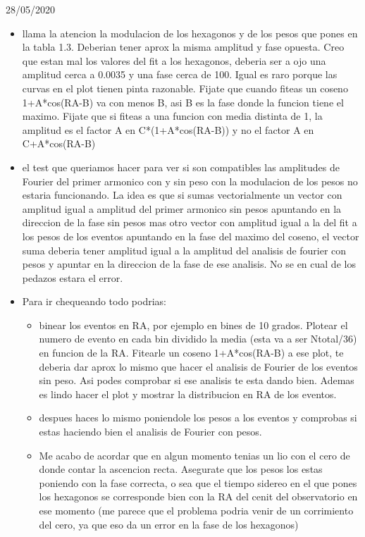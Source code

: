 28/05/2020

\begin{itemize}
	\item llama la atencion la modulacion de los hexagonos y de los pesos que pones en la tabla 1.3. Deberian tener aprox la misma amplitud y fase opuesta. Creo que estan mal los valores del fit a los hexagonos, deberia ser a ojo una amplitud cerca a 0.0035 y una fase cerca de 100. Igual es raro porque las curvas en el plot tienen pinta razonable.
Fijate que cuando fiteas un coseno 1+A*cos(RA-B) va con menos B, asi B es la fase donde la funcion tiene el maximo. Fijate que si fiteas a una funcion con media distinta de 1, la amplitud es el factor A en C*(1+A*cos(RA-B)) y  no el factor  A en C+A*cos(RA-B)
\item  el test que queriamos hacer para ver si son compatibles las amplitudes de Fourier del primer armonico con y sin peso con la modulacion de los pesos no estaria funcionando. La idea es que si sumas vectorialmente un vector con amplitud igual a amplitud del primer armonico sin pesos apuntando en la direccion de la fase sin pesos mas otro vector con amplitud igual a la del fit a los pesos de los eventos apuntando en la fase del maximo del coseno, el vector suma deberia tener amplitud igual a la amplitud del analisis de fourier con pesos y apuntar en la direccion de la fase de ese analisis. No se en cual de los pedazos estara el error.
\item Para ir chequeando todo podrias:
\begin{itemize}
\item  binear los eventos en RA, por ejemplo en bines de 10 grados. Plotear el numero de evento en cada bin dividido la media (esta va a ser Ntotal/36) en funcion de la RA. Fitearle un coseno 1+A*cos(RA-B) a ese plot, te deberia dar aprox lo mismo que hacer el analisis de Fourier de los eventos sin peso. Asi podes comprobar si ese analisis te esta dando bien. Ademas es lindo hacer el plot y mostrar la distribucion en RA de los eventos.
\item  despues haces lo mismo poniendole los pesos a los eventos y comprobas si estas haciendo bien el analisis de Fourier con pesos.
\item  Me acabo de acordar que en algun momento tenias un lio con el  cero de donde contar la ascencion recta. Asegurate que los pesos los estas poniendo con la fase correcta, o sea que el tiempo sidereo en el que pones los hexagonos se corresponde bien con la RA del cenit del observatorio en ese momento (me parece que el problema podria venir de un corrimiento del cero, ya que eso da un error en la fase de los hexagonos)
\end{itemize}

\end{itemize}
